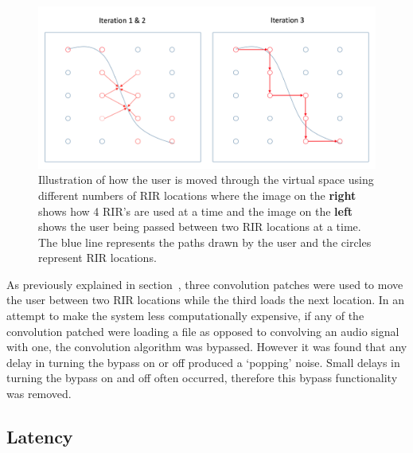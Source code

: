 \documentclass[../../main.tex]{subfiles}
\begin{document}
		\begin{figure}[H]
			\centerline{\includegraphics[scale = 0.4]{Sections/Implementation/Max/images/Max/iterationMovement.png}}
			\caption{Illustration of how the user is moved through the virtual space using different numbers of \ac{RIR} locations where the image on the \textbf{right} shows how 4 \ac{RIR}'s are used at a time and the image on the \textbf{left}  shows the user being passed between two \ac{RIR} locations at a time. The blue line represents the paths drawn by the user and the circles represent \ac{RIR locations}.}
			\label{iterationMovement}
		\end{figure}

	As previously explained in section~, three convolution patches were used to move the user between two \ac{RIR} locations while the third loads the next location. In an attempt to make the system less computationally expensive, if any of the convolution patched were loading a file as opposed to convolving an audio signal with one, the convolution algorithm was bypassed. However it was found that any delay in turning the bypass on or off produced a `popping' noise. Small delays in turning the bypass on and off often occurred, therefore this bypass functionality was removed.


	\subsection{Latency}
\end{document}

